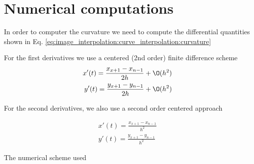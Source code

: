 \appendix
\section{Numerical computations}

In order to computer the curvature we need to compute the differential quantities shown in Eq. \ref{eq:image_interpolation:curve_interpolation:curvature} 

For the first derivatives we use a centered (2nd order) finite difference scheme
\begin{eqnarray}
	x'(t)=\frac{x_{x+1}-x_{n-1}}{2h}+\O(h^2)\\
	y'(t)=\frac{y_{x+1}-y_{n-1}}{2h}+\O(h^2)
\end{eqnarray}

For the second derivatives, we also use a second order centered approach

\begin{eqnarray}
	x'(t)=\frac{x_{x+1}-x_{n-1}}{h^2}\\
	y'(t)=\frac{y_{x+1}-y_{n-1}}{h^2}
\end{eqnarray}

The numerical scheme used 
\cite{math:computational_geometry:2006:comparison_of_numerical_techniques_for_euclidean_curvature}